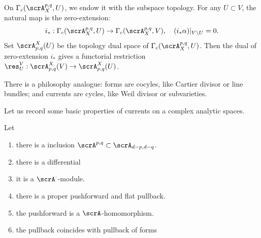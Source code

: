 \begin{construction}[label=\labelNFM{constr:currents}, status=draft, tag=0000000]
	On $\Gamma_c(\scrA_X^{p,q},U)$, we endow it with the subspace topology.
	For any $U \subset V$, the natural map is the zero-extension:
	\[ i_*: \Gamma_c(\scrA_X^{p,q},U) \to \Gamma_c(\scrA_X^{p,q},V), \quad (i_*\alpha)|_{V\setminus U} = 0. \]
	Set $\scrA_{p,q}^X(U)$ be the topology dual space of $\Gamma_c(\scrA_X^{p,q},U)$.
	Then the dual of zero-extension $i_*$ gives a functorial restriction $\res^V_U: \scrA_{p,q}^X(V) \to \scrA_{p,q}^X(U)$.

	\Yang{}
\end{construction}

\begin{example}[label=\labelNFM{eg:forms-as-currents}, status=draft, tag=0000000]

	\Yang{}
\end{example}

\begin{example}[label=\labelNFM{eg:submainfolds-as-currents}, status=draft, tag=0000000]
	\Yang{}
\end{example}

\begin{example}[label=\labelNFM{eg:measure-and-distribution-as-currents}, status=draft, tag=0000000]
	\Yang{}
\end{example}

\begin{slogan}
	There is a philosophy analogue: forms are cocyles, like Cartier divisor or line bundles; and currents are cycles, like Weil divisor or subvarieties.
	\Yang{}
\end{slogan}

Let us record some basic properties of currents on a complex analytic spaces.

\begin{proposition}[label=\labelNFM{prop:basic-properties}, status=draft, tag=0000000]
	Let \Yang{}
	\begin{enumerate}
		\item there is a inclusion $\scrA^{p,q} \subset \scrA_{d-p,d-q}$.
		\item there is a differential
		\item it is a $\scrA^\cdot$-module.
		\item there is a proper pushforward and flat pullback.
		\item the pushforward is a $\scrA$-homomorphism.
		\item the pullback coincides with pullback of forms
	\end{enumerate}
	\Yang{}
\end{proposition}



